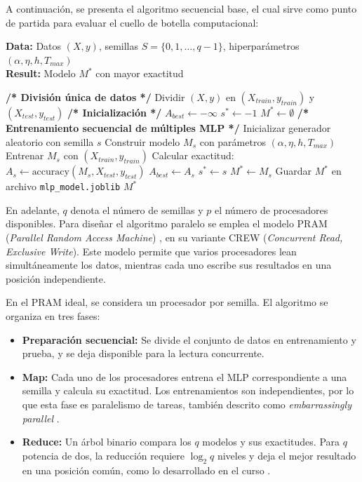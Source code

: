 \documentclass[11pt, a4paper]{article}
\begin{document}
A continuación, se presenta el algoritmo secuencial base, el cual sirve como punto de partida para evaluar el cuello de botella computacional:

\begin{algorithm}[H]
\caption{Entrenamiento secuencial de múltiples MLP con distintas semillas}
\textbf{Data:} Datos $(X, y)$, semillas $S = \{0, 1, \dots, q - 1\}$, hiperparámetros $(\alpha, \eta, h, T_{max})$\\
\textbf{Result:} Modelo $M^*$ con mayor exactitud
\begin{algorithmic}[1]
\State \textbf{/* División única de datos */}
\State Dividir $(X, y)$ en $(X_{train}, y_{train})$ y $(X_{test}, y_{test})$
\State \textbf{/* Inicialización */}
\State $A_{best} \gets -\infty$
\State $s^* \gets -1$
\State $M^* \gets \emptyset$
\State \textbf{/* Entrenamiento secuencial de múltiples MLP */}
    \State Inicializar generador aleatorio con semilla $s$
    \State Construir modelo $M_s$ con parámetros $(\alpha, \eta, h, T_{max})$
    \State Entrenar $M_s$ con $(X_{train}, y_{train})$
    \State Calcular exactitud: $A_s \gets \text{accuracy}(M_s, X_{test}, y_{test})$
        \State $A_{best} \gets A_s$
        \State $s^* \gets s$
        \State $M^* \gets M_s$
    \EndIf
\EndFor
\State Guardar $M^*$ en archivo \texttt{mlp\_model.joblib}
\State \Return $M^*$
\end{algorithmic}
\end{algorithm}


En adelante, $q$ denota el número de semillas y $p$ el número de procesadores disponibles. Para diseñar el algoritmo paralelo se emplea el modelo PRAM (\textit{Parallel Random Access Machine}) \cite{jaja1992parallel}, en su variante CREW (\textit{Concurrent Read, Exclusive Write}). Este modelo permite que varios procesadores lean simultáneamente los datos, mientras cada uno escribe sus resultados en una posición independiente.

En el PRAM ideal, se considera un procesador por semilla. El algoritmo se organiza en tres fases:
\begin{itemize}
    \item \textbf{Preparación secuencial:} Se divide el conjunto de datos en entrenamiento y prueba, y se deja disponible para la lectura concurrente.
    \item \textbf{Map:} Cada uno de los procesadores entrena el MLP correspondiente a una semilla y calcula su exactitud. Los entrenamientos son independientes, por lo que esta fase es paralelismo de tareas, también descrito como \textit{embarrassingly parallel} \cite{farias2022parallelmlps}.
    \item \textbf{Reduce:} Un árbol binario compara los $q$ modelos y sus exactitudes. Para $q$ potencia de dos, la reducción requiere $\log_2 q$ niveles y deja el mejor resultado en una posición común, como lo desarrollado en el curso \cite{u2.2}.
\end{itemize}
\end{document}
